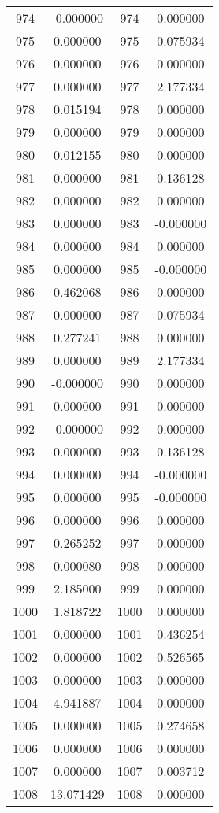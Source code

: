 \documentclass[12pt]{article}
\begin{document}
\begin{longtable}{@{}cccc@{}}
974 & -0.000000 & 974 & 0.000000 \\
975 & 0.000000 & 975 & 0.075934 \\
976 & 0.000000 & 976 & 0.000000 \\
977 & 0.000000 & 977 & 2.177334 \\
978 & 0.015194 & 978 & 0.000000 \\
979 & 0.000000 & 979 & 0.000000 \\
980 & 0.012155 & 980 & 0.000000 \\
981 & 0.000000 & 981 & 0.136128 \\
982 & 0.000000 & 982 & 0.000000 \\
983 & 0.000000 & 983 & -0.000000 \\
984 & 0.000000 & 984 & 0.000000 \\
985 & 0.000000 & 985 & -0.000000 \\
986 & 0.462068 & 986 & 0.000000 \\
987 & 0.000000 & 987 & 0.075934 \\
988 & 0.277241 & 988 & 0.000000 \\
989 & 0.000000 & 989 & 2.177334 \\
990 & -0.000000 & 990 & 0.000000 \\
991 & 0.000000 & 991 & 0.000000 \\
992 & -0.000000 & 992 & 0.000000 \\
993 & 0.000000 & 993 & 0.136128 \\
994 & 0.000000 & 994 & -0.000000 \\
995 & 0.000000 & 995 & -0.000000 \\
996 & 0.000000 & 996 & 0.000000 \\
997 & 0.265252 & 997 & 0.000000 \\
998 & 0.000080 & 998 & 0.000000 \\
999 & 2.185000 & 999 & 0.000000 \\
1000 & 1.818722 & 1000 & 0.000000 \\
1001 & 0.000000 & 1001 & 0.436254 \\
1002 & 0.000000 & 1002 & 0.526565 \\
1003 & 0.000000 & 1003 & 0.000000 \\
1004 & 4.941887 & 1004 & 0.000000 \\
1005 & 0.000000 & 1005 & 0.274658 \\
1006 & 0.000000 & 1006 & 0.000000 \\
1007 & 0.000000 & 1007 & 0.003712 \\
1008 & 13.071429 & 1008 & 0.000000 \\

\end{longtable}
\end{document}
